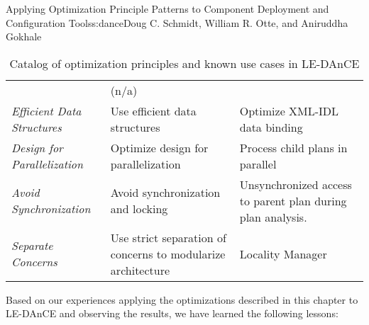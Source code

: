 \begin{aosachapter}{Applying Optimization Principle Patterns to Component Deployment and
                    Configuration Tools}{s:dance}{Doug C. Schmidt, William R. Otte, and Aniruddha Gokhale}
\begin{table}
{\begin{tabular}{p{2.5cm} p{3.5cm} p{5.4cm}}
& (n/a)
\\
\emph{Efficient Data \newline Structures}
& Use efficient data structures
& Optimize XML-IDL data binding
\\
\emph{Design for Parallelization}
& Optimize design for parallelization
& Process child plans in parallel
\\
\emph{Avoid Synchronization}
& Avoid synchronization and locking
& Unsynchronized access to parent plan during \newline plan analysis.
\\
\emph{Separate Concerns}
& Use strict separation of concerns to modularize architecture
& Locality Manager
\\
\hline
\end{tabular}
}
\caption{Catalog of optimization principles and known use cases in LE-DAnCE}
\label{tbl:conc:principles}
\end{table}

Based on our experiences applying the optimizations described in this
chapter to LE-DAnCE and observing the results, we have learned the
following lessons:


\end{aosachapter}
